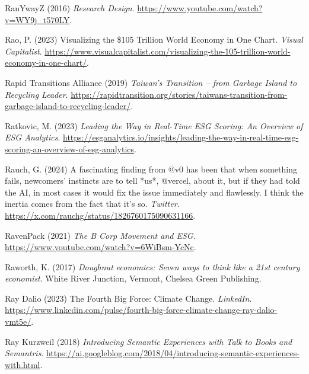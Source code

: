 \documentclass[
  letterpaper,
  DIV=11,
  numbers=noendperiod]{scrartcl}
\newlength{\cslhangindent}
\newenvironment{CSLReferences}[2] %
 {\begin{list}{}{%
  \setlength{\itemindent}{0pt}
  \setlength{\leftmargin}{0pt}
  \setlength{\parsep}{0pt}
  \ifodd #1
   \setlength{\leftmargin}{\cslhangindent}
   \setlength{\itemindent}{-1\cslhangindent}
  \fi
  \setlength{\itemsep}{#2\baselineskip}}}
 {\end{list}}
\begin{document}
\begin{CSLReferences}{0}{1}
RanYwayZ (2016) \emph{Research {Design}}.
\url{https://www.youtube.com/watch?v=WY9j_t570LY}.

Rao, P. (2023) Visualizing the \$105 {Trillion World Economy} in {One
Chart}. \emph{Visual Capitalist}.
\url{https://www.visualcapitalist.com/visualizing-the-105-trillion-world-economy-in-one-chart/}.

Rapid Transitions Alliance (2019) \emph{Taiwan's {Transition} -- from
{Garbage Island} to {Recycling Leader}}.
\url{https://rapidtransition.org/stories/taiwans-transition-from-garbage-island-to-recycling-leader/}.

Ratkovic, M. (2023) \emph{Leading the {Way} in {Real-Time ESG Scoring}:
{An Overview} of {ESG Analytics}}.
\url{https://esganalytics.io/insights/leading-the-way-in-real-time-esg-scoring-an-overview-of-esg-analytics}.

Rauch, G. (2024) A fascinating finding from @v0 has been that when
something fails, newcomers' instincts are to tell *us*, @vercel, about
it, but if they had told the {AI}, in most cases it would fix the issue
immediately and flawlessly. {I} think the inertia comes from the fact
that it's so. \emph{Twitter}.
\url{https://x.com/rauchg/status/1826760175090631166}.

RavenPack (2021) \emph{The {B Corp Movement} and {ESG}}.
\url{https://www.youtube.com/watch?v=6WiBsm-YcNc}.

Raworth, K. (2017) \emph{Doughnut economics: Seven ways to think like a
21st century economist}. White River Junction, Vermont, Chelsea Green
Publishing.

Ray Dalio (2023) The {Fourth Big Force}: {Climate Change}.
\emph{LinkedIn}.
\url{https://www.linkedin.com/pulse/fourth-big-force-climate-change-ray-dalio-vmt5e/}.

Ray Kurzweil (2018) \emph{Introducing {Semantic Experiences} with {Talk}
to {Books} and {Semantris}}.
\url{https://ai.googleblog.com/2018/04/introducing-semantic-experiences-with.html}.


\end{CSLReferences}
\end{document}
